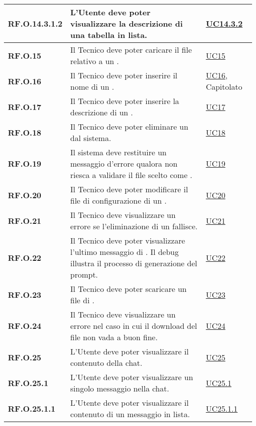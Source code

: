 \begin{adjustwidth}{-0.5cm}{-0.5cm}
\begin{longtable}{|P{3cm}|P{6,5cm}|>{\arraybackslash}P{4cm}|}
    \hline
    \textbf{RF.O.14.3.1.2} & L'Utente deve poter visualizzare la descrizione di una tabella in lista. & \hyperref[UC14point3point2]{UC14.3.2}\\
    \hline
    \textbf{RF.O.15} & Il Tecnico deve poter caricare il file relativo a un . & \hyperref[UC15]{UC15}\\
    \hline
    \textbf{RF.O.16} & Il Tecnico deve poter inserire il nome di un . & \hyperref[UC16]{UC16}, Capitolato\\
    \hline
    \textbf{RF.O.17} & Il Tecnico deve poter inserire la descrizione di un . & \hyperref[UC17]{UC17}\\
    \hline
    \textbf{RF.O.18} & Il Tecnico deve poter eliminare un  dal sistema. & \hyperref[UC18]{UC18}\\
    \hline
    \textbf{RF.O.19} & Il sistema deve restituire un messaggio d'errore qualora non riesca a validare il file scelto come . & \hyperref[UC19]{UC19} \\
    \hline 
    \textbf{RF.O.20} & Il Tecnico deve poter modificare il file di configurazione di un . & \hyperref[UC20]{UC20} \\
    \hline
    \textbf{RF.O.21} & Il Tecnico deve visualizzare un errore se l'eliminazione di un  fallisce. & \hyperref[21]{UC21}\\
    \hline
    \textbf{RF.O.22} & Il Tecnico deve poter visualizzare l'ultimo messaggio di . Il debug illustra il processo di generazione del prompt. & \hyperref[22]{UC22}\\
    \hline
    \textbf{RF.O.23} & Il Tecnico deve poter scaricare un file di . & \hyperref[23]{UC23}\\
    \hline
    \textbf{RF.O.24} & Il Tecnico deve visualizzare un errore nel caso in cui il download del file non vada a buon fine. &  \hyperref[UC24]{UC24}\\
    \hline
    \textbf{RF.O.25} & L'Utente deve poter visualizzare il contenuto della chat. &  \hyperref[UC25]{UC25}\\
    \hline
    \textbf{RF.O.25.1} & L'Utente deve poter visualizzare un singolo messaggio nella chat. &  \hyperref[UC25point1]{UC25.1}\\
    \hline
    \textbf{RF.O.25.1.1} & L'Utente deve poter visualizzare il contenuto di un messaggio in lista. &  \hyperref[UC25point1point1]{UC25.1.1}\\

\end{longtable}
\end{adjustwidth}
